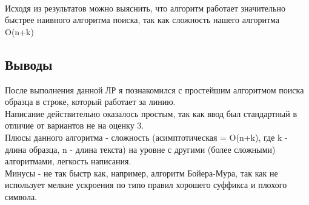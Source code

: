 \documentclass[12pt]{article}
\begin{document}
    \\
    
Исходя из результатов можно выяснить, что алгоритм работает значительно быстрее наивного алгоритма поиска, так как сложность нашего алгоритма O(n+k)

    \subsection*{Выводы}
    После выполнения данной ЛР я познакомился с простейшим алгоритмом поиска образца в строке, который работает за линию.\\
    Написание действительно оказалось простым, так как ввод был стандартный в отличие от вариантов не на оценку 3.\\
    Плюсы данного алгоритма - сложность (асимптотическая = O(n+k), где k - длина образца, n - длина текста) на уровне с другими (более сложными) алгоритмами, легкость написания.\\
    Минусы - не так быстр как, например, алгоритм Бойера-Мура, так как не использует мелкие ускроения по типо правил хорошего суффикса и плохого символа.
    
\end{document}
